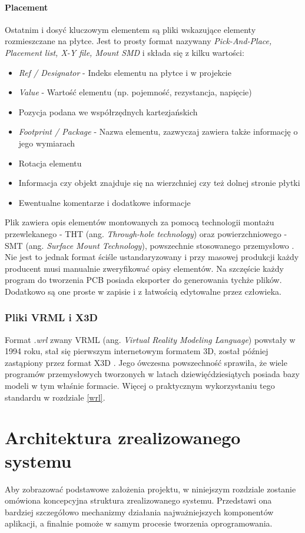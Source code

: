 \documentclass{xmgr}
\begin{document}
\subsubsection {Placement}
Ostatnim i dosyć kluczowym elementem są pliki wskazujące elementy rozmieszczane na płytce. Jest to prosty format nazywany \emph {Pick-And-Place, Placement list, X-Y file, Mount SMD}  i składa się z kilku wartości:
\begin{itemize}
\item \emph{Ref / Designator} - Indeks elementu na płytce i w projekcie
\item \emph{Value} - Wartość elementu (np. pojemność, rezystancja, napięcie)
\item Pozycja podana we współrzędnych kartezjańskich
\item \emph{Footprint / Package} - Nazwa elementu, zazwyczaj zawiera także informację o jego wymiarach
\item Rotacja elementu
\item Informacja czy objekt znajduje się na wierzchniej czy też dolnej stronie płytki
\item Ewentualne komentarze i dodatkowe informacje
\end{itemize}
Plik zawiera opis elementów montowanych za pomocą technologii montażu przewlekanego - THT (ang. \emph{Through-hole technology}) oraz powierzchniowego - SMT (ang. \emph{Surface Mount Technology}), powszechnie stosowanego przemysłowo \cite {prasad}. Nie jest to jednak format ściśle ustandaryzowany i przy masowej produkcji każdy producent musi manualnie zweryfikować opisy elementów. Na szczęście każdy program do tworzenia PCB posiada eksporter do generowania tychże plików. Dodatkowo są one proste w zapisie i z łatwością edytowalne przez człowieka.

\subsection{Pliki VRML i X3D}
Format \emph{.wrl} zwany VRML (ang. \emph {Virtual Reality Modeling Language}) powstały w 1994 roku, stał się pierwszym internetowym formatem 3D, został później zastąpiony przez format X3D \cite{vrml}. Jego ówczesna powszechność sprawiła, że wiele programów przemysłowych tworzonych w latach dziewięćdziesiątych posiada bazy modeli w tym właśnie formacie. Więcej o praktycznym wykorzystaniu tego standardu w rozdziale \ref{wrl}.

\chapter{Architektura zrealizowanego systemu}
Aby zobrazować podstawowe założenia projektu, w niniejszym rozdziale zostanie omówiona koncepcyjna struktura zrealizowanego systemu. Przedstawi ona bardziej szczegółowo mechanizmy działania najważniejszych komponentów aplikacji, a finalnie pomoże w samym procesie tworzenia oprogramowania.
\end{document}
